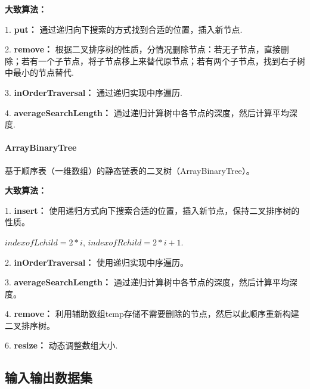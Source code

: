 \documentclass[UTF8]{ctexart}
\begin{document}
\textbf{大致算法：}

1. \textbf{put：} 通过递归向下搜索的方式找到合适的位置，插入新节点.

2. \textbf{remove：} 根据二叉排序树的性质，分情况删除节点：若无子节点，直接删除；若有一个子节点，将子节点移上来替代原节点；若有两个子节点，找到右子树中最小的节点替代.

3. \textbf{inOrderTraversal：} 通过递归实现中序遍历.

4. \textbf{averageSearchLength：} 通过递归计算树中各节点的深度，然后计算平均深度.

\paragraph*{ArrayBinaryTree}

基于顺序表（一维数组）的静态链表的二叉树（ArrayBinaryTree）。

\textbf{大致算法：}

1. \textbf{insert：} 使用递归方式向下搜索合适的位置，插入新节点，保持二叉排序树的性质。

    $index of Lchild = 2 * i$, $index of Rchild = 2 * i + 1.$

2. \textbf{inOrderTraversal：} 使用递归实现中序遍历。

3. \textbf{averageSearchLength：} 通过递归计算树中各节点的深度，然后计算平均深度。

4. \textbf{remove：} 利用辅助数组temp存储不需要删除的节点，然后以此顺序重新构建二叉排序树。

6. \textbf{resize：} 动态调整数组大小.



\subsection*{输入输出数据集}
\end{document}
